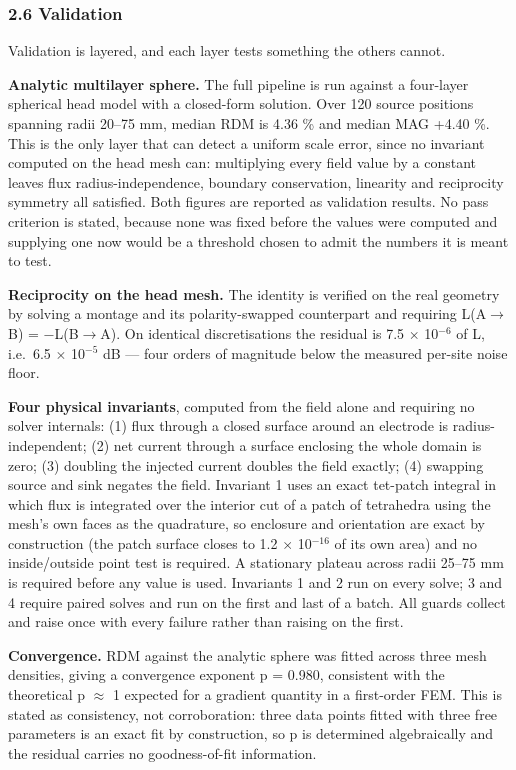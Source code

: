\documentclass[
  11pt,
]{article}
\newcounter{none} %
\begin{document}
\subsubsection{2.6 Validation}\label{validation}

Validation is layered, and each layer tests something the others cannot.

\textbf{Analytic multilayer sphere.} The full pipeline is run against a four-layer
spherical head model with a closed-form solution. Over 120 source positions
spanning radii 20--75 mm, median RDM is 4.36 \% and median MAG +4.40 \%. This is
the only layer that can detect a uniform scale error, since no invariant
computed on the head mesh can: multiplying every field value by a constant
leaves flux radius-independence, boundary conservation, linearity and
reciprocity symmetry all satisfied. Both figures are reported as validation
results. No pass criterion is stated, because none was fixed before the values
were computed and supplying one now would be a threshold chosen to admit the
numbers it is meant to test.

\textbf{Reciprocity on the head mesh.} The identity is verified on the real geometry
by solving a montage and its polarity-swapped counterpart and requiring
L(A\(\rightarrow\)B) = −L(B\(\rightarrow\)A). On identical discretisations the residual is 7.5 \(\times\) 10\(^{-6}\) of
\textbar L\textbar, i.e.~6.5 \(\times\) 10\(^{-5}\) dB --- four orders of magnitude below the measured per-site
noise floor.

\textbf{Four physical invariants}, computed from the field alone and requiring no
solver internals: (1) flux through a closed surface around an electrode is
radius-independent; (2) net current through a surface enclosing the whole domain
is zero; (3) doubling the injected current doubles the field exactly; (4)
swapping source and sink negates the field. Invariant 1 uses an exact tet-patch
integral in which flux is integrated over the interior cut of a patch of
tetrahedra using the mesh's own faces as the quadrature, so enclosure and
orientation are exact by construction (the patch surface closes to 1.2 \(\times\) 10\(^{-16}\)
of its own area) and no inside/outside point test is required. A stationary
plateau across radii 25--75 mm is required before any value is used. Invariants 1
and 2 run on every solve; 3 and 4 require paired solves and run on the first and
last of a batch. All guards collect and raise once with every failure rather
than raising on the first.

\textbf{Convergence.} RDM against the analytic sphere was fitted across three mesh
densities, giving a convergence exponent p = 0.980, consistent with the
theoretical p \(\approx\) 1 expected for a gradient quantity in a first-order FEM. This is
stated as consistency, not corroboration: three data points fitted with three
free parameters is an exact fit by construction, so p is determined
algebraically and the residual carries no goodness-of-fit information.
\end{document}
